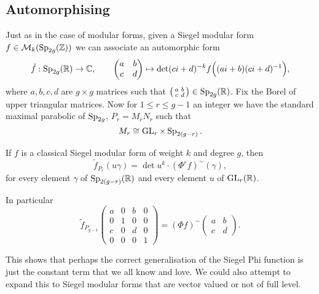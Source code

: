 \subsection{Automorphising}
Just as in the case of modular forms, given a Siegel modular form \(f\in \mathcal{M}_k(\Sp_{2g}(\Z))\) we can associate an automorphic form
\[\tilde{f} : \Sp_{2g}(\R)\to\C, \qquad \begin{pmatrix} a & b\\ c & d\end{pmatrix}\mapsto \det(ci+d)^{-k} f\Bigl((ai+b)(ci+d)\inv\Bigr), \]
where \(a,b,c,d\) are \(g\times g\) matrices such that \(\bigl(\begin{smallmatrix} a & b\\ c & d\end{smallmatrix}\bigr)\in\Sp_{2g}(\R)\). Fix the Borel of upper triangular matrices. Now for \(1\leq r\leq g-1\) an integer we have the standard maximal parabolic of \(\operatorname{Sp}_{2g}\), \(P_r = M_rN_r\) such that 
\[M_r \cong \operatorname{GL}_r\times \operatorname{Sp}_{2(g-r)}.\]

\begin{Theorem}[Zhang]
	If \(f\) is a classical Siegel modular form of weight \(k\) and degree \(g\), then
	\begin{equation} 
		\tilde f_{P_r}(u\gamma) = \det u^k\cdot (\Phi^{r} f)^\sim(\gamma),
	\end{equation}
	for every element \(\gamma\) of \(\Sp_{2(g-r)}(\R)\) and every element \(u\) of \(\GL_{r}(\R)\).
	
	In particular 
	\[\tilde{f}_{P_{g-1}}\begin{pmatrix} a & 0 & b & 0\\ 0 & 1 & 0 & 0\\ c & 0 & d & 0\\ 0 & 0 & 0 & 1\end{pmatrix} = (\Phi f)^\sim\begin{pmatrix}
		a & b\\
		c& d
	\end{pmatrix}.\]
\end{Theorem}

This shows that perhaps the correct generalisation of the Siegel Phi function is just the constant term that we all know and love. We could also attempt to expand this to Siegel modular forms that are vector valued or not of full level. 

